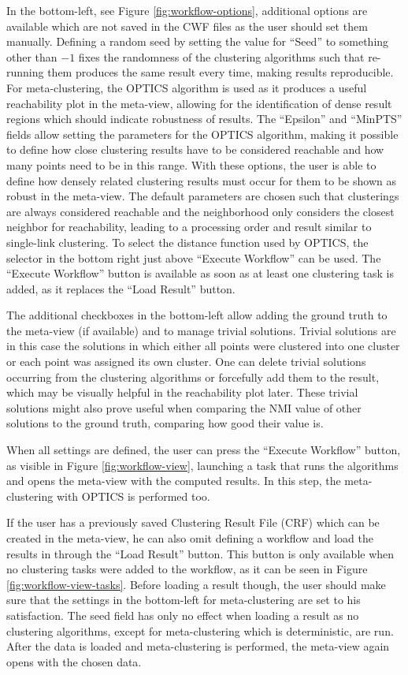 \documentclass[
	a4paper,
	english,
	twoside,
	openright,               
	11pt                            
	]{report}
\begin{document}
In the bottom-left, see Figure \ref{fig:workflow-options}, additional options are available which are not saved in the CWF files as the user should set them manually. Defining a random seed by setting the value for ``Seed'' to something other than $-1$ fixes the randomness of the clustering algorithms such that re-running them produces the same result every time, making results reproducible. For meta-clustering, the OPTICS \cite{10.1145/304181.304187} algorithm is used as it produces a useful reachability plot in the meta-view, allowing for the identification of dense result regions which should indicate robustness of results. The ``Epsilon'' and ``MinPTS'' fields allow setting the parameters for the OPTICS algorithm, making it possible to define how close clustering results have to be considered reachable and how many points need to be in this range. With these options, the user is able to define how densely related clustering results must occur for them to be shown as robust in the meta-view. The default parameters are chosen such that clusterings are always considered reachable and the neighborhood only considers the closest neighbor for reachability, leading to a processing order and result similar to single-link clustering. To select the distance function used by OPTICS, the selector in the bottom right just above ``Execute Workflow'' can be used. The ``Execute Workflow'' button is available as soon as at least one clustering task is added, as it replaces the ``Load Result'' button.

The additional checkboxes in the bottom-left allow adding the ground truth to the meta-view (if available) and to manage trivial solutions. Trivial solutions are in this case the solutions in which either all points were clustered into one cluster or each point was assigned its own cluster. One can delete trivial solutions occurring from the clustering algorithms or forcefully add them to the result, which may be visually helpful in the reachability plot later. These trivial solutions might also prove useful when comparing the NMI value of other solutions to the ground truth, comparing how good their value is.

When all settings are defined, the user can press the ``Execute Workflow'' button, as visible in Figure \ref{fig:workflow-view}, launching a task that runs the algorithms and opens the meta-view with the computed results. In this step, the meta-clustering with OPTICS \cite{10.1145/304181.304187} is performed too.

If the user has a previously saved Clustering Result File (CRF) which can be created in the meta-view, he can also omit defining a workflow and load the results in through the ``Load Result'' button. This button is only available when no clustering tasks were added to the workflow, as it can be seen in Figure \ref{fig:workflow-view-tasks}. Before loading a result though, the user should make sure that the settings in the bottom-left for meta-clustering are set to his satisfaction. The seed field has only no effect when loading a result as no clustering algorithms, except for meta-clustering which is deterministic, are run. After the data is loaded and meta-clustering is performed, the meta-view again opens with the chosen data.
\end{document}
